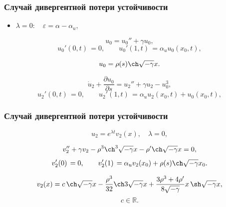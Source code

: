 \documentclass[fullscreen=true, unicode, bookmarks=false]{beamer}
\begin{document}
\begin{frame}
\frametitle{ Случай дивергентной потери устойчивости }

\begin{itemize}
\item { $ \lambda = 0: \quad \varepsilon=\alpha-\alpha_u, $
}
\end{itemize}

\medskip

\begin{equation}
	u_0 = u_0'' + \gamma u_0,
\end{equation}
\begin{equation}
	u_0'(0, t) \, = 0, \qquad u_0'(1, t) \, = \alpha_u u_0(x_0, t),
\end{equation}

$$ u_0 = \rho(s) \ch \sqrt{-\gamma} x. $$

\medskip

\begin{equation}
	\dot u_2 + \frac{\partial u_0}{\partial s} = u_2'' + \gamma u_2 - u_0^3,
\end{equation}
\begin{equation}
	u_2'(0, t) \, = 0, \qquad u_2'(1, t) \, = \alpha_u u_2(x_0, t) + u_0(x_0, t),
\end{equation}

\end{frame}

\begin{frame}
\frametitle{ Случай дивергентной потери устойчивости }

$$ u_2 = e^{\lambda t}v_2(x), \quad \lambda = 0, $$

\medskip

\begin{equation}
	v_2'' + \gamma v_2 - \rho^3 \ch^3 \sqrt{-\gamma} x - \rho' \ch \sqrt{-\gamma} x = 0,
\end{equation}
\begin{equation}
	v_2'(0) \, = 0, \qquad v_2'(1) \, = \alpha_u v_2(x_0) + \rho(s) \ch \sqrt{-\gamma} x_0.
\end{equation}

\medskip

$$ v_2(x) = c \, \ch \sqrt{-\gamma} x - \frac{\rho^3}{32} \ch 3\sqrt{-\gamma} x + \frac{3\rho^3 + 4\rho'}{8\sqrt{-\gamma}} x \, \sh \sqrt{-\gamma} x, $$
$$ c \in \mathbb{R}. $$

\end{frame}
\end{document}
